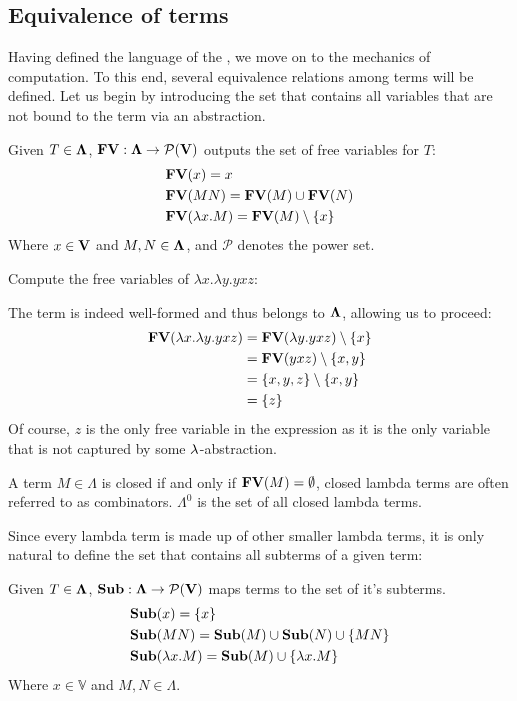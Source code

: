 \documentclass[12pt]{book}
\begin{document}
\subsection{\centering Equivalence of terms}
Having defined the language of the \lcalc, we move on to the mechanics of computation. To this end, several equivalence relations among terms will be defined. Let us begin by introducing the set that contains all variables that are not bound to the term via an abstraction.
\begin{definition} Given $T \in \mathbf{\Lambda} $, $\mathbf{FV} : \mathbf{\Lambda} \to \mathcal{P}(\mathbf{V}) $ outputs the set of free variables for $T$:
  \begin{align*}
    & \mathbf{FV}(x) = {x}\\
    & \mathbf{FV}(MN) = \mathbf{FV}(M) \cup \mathbf{FV}(N) \\
    & \mathbf{FV}(\lambda x . M) = \mathbf{FV}(M) \setminus \{x\}
  \end{align*}
  Where $ x \in \mathbf{V} $ and $ M, N \in \mathbf{\Lambda} $, and $\mathcal{P}$ denotes the power set.
\end{definition}
\begin{example}
  Compute the free variables of $\lambda x . \lambda y . y x z$:
  
  The term is indeed well-formed and thus belongs to $\mathbf{\Lambda}$, allowing us to proceed:
  \begin{align*}
    \mathbf{FV}(\lambda x . \lambda y . y x z) &= \mathbf{FV}(\lambda y . yxz) \setminus \{x\} \\
                                        &= \mathbf{FV}(yxz) \setminus \{x, y\} \\
                                        &= \{x, y, z\} \setminus \{x, y\} \\
                                        &= \{z\}
  \end{align*}
  Of course, $z$ is the only free variable in the expression as it is the only variable that is not captured by some $\lambda$-abstraction.
\end{example}
\begin{definition}
  A term $M \in \Lambda$ is closed if and only if $\mathbf{FV}(M) = \emptyset$, closed lambda terms are often referred to as combinators. $\Lambda^0$ is the set of all closed lambda terms.
\end{definition}
Since every lambda term is made up of other smaller lambda terms, it is only natural to define the set that contains all subterms of a given term:
\begin{definition} Given $T \in \mathbf{\Lambda}$, $\mathbf{Sub} : \mathbf{\Lambda} \to \mathcal{P}(\mathbf{V})$ maps terms to the set of it's subterms.
  \begin{align*}
    &\mathbf{Sub}(x) = \{x\} \\
    &\mathbf{Sub}(MN) = \mathbf{Sub}(M)  \cup \mathbf{Sub}(N) \cup \{MN\} \\
    &\mathbf{Sub}(\lambda x . M) = \mathbf{Sub}(M)  \cup \{\lambda x. M\}
  \end{align*}
  Where $x \in \mathbb{V}$ and $M, N \in \Lambda $.
\end{definition}
\end{document}
